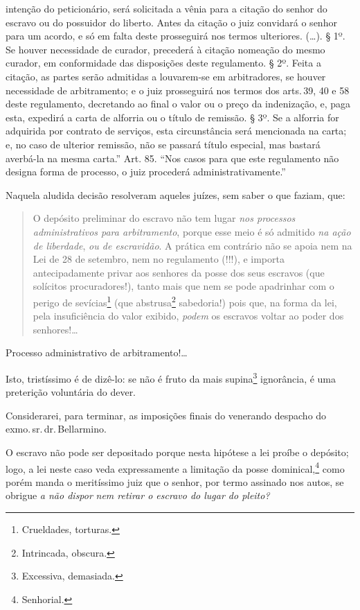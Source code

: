 {  intenção do peticionário, será solicitada a vênia para a citação do
  senhor do escravo ou do possuidor do liberto. Antes da citação o juiz
  convidará o senhor para um acordo, e só em falta deste prosseguirá nos
  termos ulteriores. (\ldots{}). § 1º. Se houver necessidade de curador,
  precederá à citação nomeação do mesmo curador, em conformidade das
  disposições deste regulamento. § 2º. Feita a citação, as partes serão
  admitidas a louvarem-se em arbitradores, se houver necessidade de
  arbitramento; e o juiz prosseguirá nos termos dos arts.\,39, 40 e 58
  deste regulamento, decretando ao final o valor ou o preço da
  indenização, e, paga esta, expedirá a carta de alforria ou o título de
  remissão. § 3º. Se a alforria for adquirida por contrato de serviços,
  esta circunstância será mencionada na carta; e, no caso de ulterior
  remissão, não se passará título especial, mas bastará averbá-la na
  mesma carta.'' Art. 85. ``Nos casos para que este regulamento não designa
  forma de processo, o juiz procederá administrativamente.''}

Naquela aludida decisão resolveram aqueles juízes, sem saber o que
faziam, que:

\begin{quote}
O depósito preliminar do escravo não tem lugar \emph{nos processos
administrativos para arbitramento}, porque esse meio é só admitido
\emph{na ação de liberdade}, \emph{ou de escravidão}. A prática em
contrário não se apoia nem na Lei de 28 de setembro, nem no regulamento
(!!!), e importa antecipadamente privar aos senhores da posse dos seus
escravos (que solícitos procuradores!), tanto mais que nem se pode
apadrinhar com o perigo de sevícias\footnote{Crueldades, torturas.}
(que abstrusa\footnote{Intrincada, obscura.} sabedoria!) pois que, na
forma da lei, pela insuficiência do valor exibido, \emph{podem} os
escravos voltar ao poder dos senhores!\ldots{}
\end{quote}

Processo administrativo de arbitramento!\ldots{}

Isto, tristíssimo é de dizê-lo: se não é fruto da mais supina\footnote{
  Excessiva, demasiada.} ignorância, é uma preterição voluntária do
dever.

Considerarei, para terminar, as imposições finais do venerando despacho
do exmo.\,sr.\,dr.\,Bellarmino.

O escravo não pode ser depositado porque nesta hipótese a lei proíbe o
depósito; logo, a lei neste caso veda expressamente a limitação da posse
dominical,\footnote{Senhorial.} como porém manda o meritíssimo juiz
que o senhor, por termo assinado nos autos, se obrigue \emph{a não
dispor} \emph{nem retirar o escravo do lugar do pleito? }

